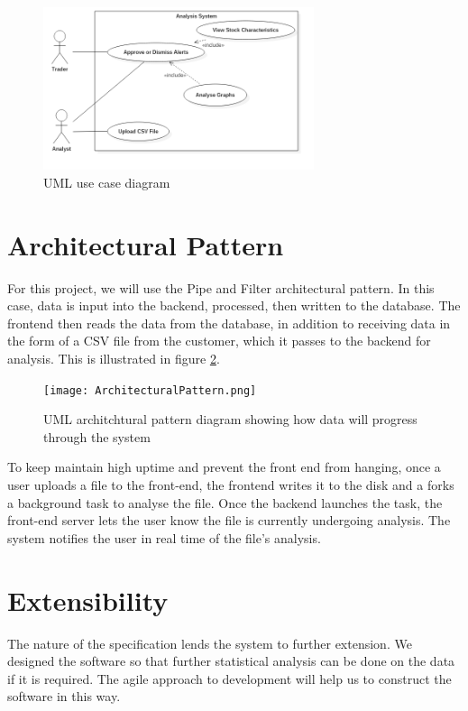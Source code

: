 \documentclass[11pt, oneside, a4paper]{article}
\begin{document}
\begin{figure}[h]
	\centering
		\includegraphics[width=300px]{UseCaseDiagram.png}
	\caption{UML use case diagram}
	\label{UseCase}
\end{figure}

\section{Architectural Pattern}
For this project, we will use the Pipe and Filter architectural pattern. In this
case, data is input into the backend, processed, then written to the database.
The frontend then reads the data from the database, in addition to receiving data in
the form of a CSV file from the customer, which it passes to the backend for analysis.
This is illustrated in figure \ref{ArchitechturalPattern}.

\begin{figure}[h]
	\centering
		\texttt{[image: ArchitecturalPattern.png]}
	\caption{UML architchtural pattern diagram showing how data will progress through the system}
	\label{ArchitechturalPattern}
\end{figure}

To keep maintain high uptime and prevent the front end from hanging, once a user
uploads a file to the front-end, the frontend writes it to the disk and a forks a
background task to analyse the file. Once the backend launches the task, the front-end
server lets the user know the file is currently undergoing analysis. The system
notifies the user in real time of the file’s analysis.

\section{Extensibility}
The nature of the specification lends the system to further extension. We designed
the software so that further statistical analysis can be done on the data if it is
required. The agile approach to development will help us to construct the software
in this way.
\end{document}

